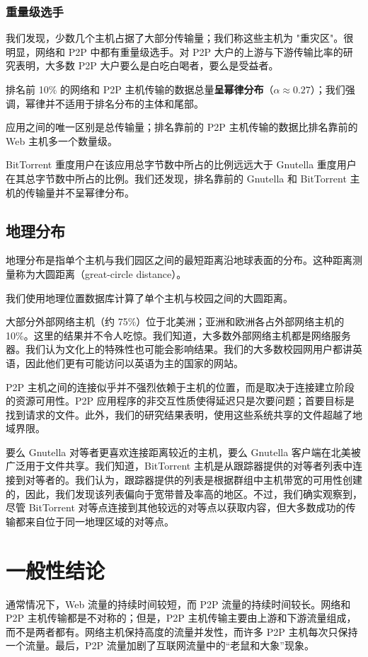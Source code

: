 \subsubsection{重量级选手}

我们发现，少数几个主机占据了大部分传输量；我们称这些主机为 "重灾区"。很明显，网络和 P2P 中都有重量级选手。对 P2P 大户的上游与下游传输比率的研究表明，大多数 P2P 大户要么是白吃白喝者，要么是受益者。

排名前 10\% 的网络和 P2P 主机传输的数据总量\textbf{呈幂律分布}（$\alpha \approx 0.27$）；我们强调，幂律并不适用于排名分布的主体和尾部。

应用之间的唯一区别是总传输量；排名靠前的 P2P 主机传输的数据比排名靠前的 Web 主机多一个数量级。

BitTorrent 重度用户在该应用总字节数中所占的比例远远大于 Gnutella 重度用户在其总字节数中所占的比例。我们还发现，排名靠前的 Gnutella 和 BitTorrent 主机的传输量并不呈幂律分布。

\subsection{地理分布}
地理分布是指单个主机与我们园区之间的最短距离沿地球表面的分布。这种距离测量称为大圆距离（great-circle distance）。

我们使用地理位置数据库计算了单个主机与校园之间的大圆距离。

大部分外部网络主机（约 75\%）位于北美洲；亚洲和欧洲各占外部网络主机的 10\%。这里的结果并不令人吃惊。我们知道，大多数外部网络主机都是网络服务器。我们认为文化上的特殊性也可能会影响结果。我们的大多数校园网用户都讲英语，因此他们更有可能访问以英语为主的国家的网站。

P2P 主机之间的连接似乎并不强烈依赖于主机的位置，而是取决于连接建立阶段的资源可用性。P2P 应用程序的非交互性质使得延迟只是次要问题；首要目标是找到请求的文件。此外，我们的研究结果表明，使用这些系统共享的文件超越了地域界限。

要么 Gnutella 对等者更喜欢连接距离较近的主机，要么 Gnutella 客户端在北美被广泛用于文件共享。我们知道，BitTorrent 主机是从跟踪器提供的对等者列表中连接到对等者的。我们认为，跟踪器提供的列表是根据群组中主机带宽的可用性创建的，因此，我们发现该列表偏向于宽带普及率高的地区。不过，我们确实观察到，尽管 BitTorrent 对等点连接到其他较远的对等点以获取内容，但大多数成功的传输都来自位于同一地理区域的对等点。

\section{一般性结论}

通常情况下，Web 流量的持续时间较短，而 P2P 流量的持续时间较长。网络和 P2P 主机传输都是不对称的；但是，P2P 主机传输主要由上游和下游流量组成，而不是两者都有。网络主机保持高度的流量并发性，而许多 P2P 主机每次只保持一个流量。最后，P2P 流量加剧了互联网流量中的``老鼠和大象''现象。